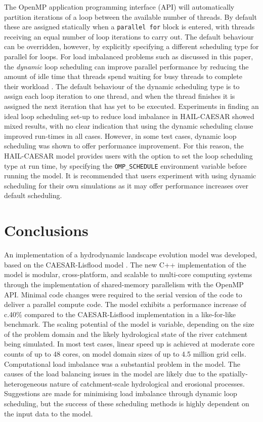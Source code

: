 The OpenMP application programming interface (API) will automatically partition iterations of a loop between the available number of threads. By default these are assigned statically when a \texttt{parallel for} block is entered, with threads receiving an equal number of loop iterations to carry out. The default behaviour can be overridden, however, by explicitly specifying a different scheduling type for parallel for loops. For load imbalanced problems such as discussed in this paper, the \textit{dynamic} loop scheduling can improve parallel performance by reducing the amount of idle time that threads spend waiting for busy threads to complete their workload \citep{willebeek1993strategies,olivier2012openmp}. The default behaviour of the dynamic scheduling type is to assign each loop iteration to one thread, and when the thread finishes it is assigned the next iteration that has yet to be executed. Experiments in finding an ideal loop scheduling set-up to reduce load imbalance in HAIL-CAESAR showed mixed results, with no clear indication that using the dynamic scheduling clause improved run-times in all cases. However, in some test cases, dynamic loop scheduling was shown to offer performance improvement. For this reason, the HAIL-CAESAR model provides users with the option to set the loop scheduling type at run time, by specifying the \texttt{OMP\_SCHEDULE} environment variable before running the model. It is recommended that users experiment with using dynamic scheduling for their own simulations as it may offer performance increases over default scheduling.



\section{Conclusions}  %
An implementation of a hydrodynamic landscape evolution model was developed, based on the CAESAR-Lisflood model \citep{Coulthard2013}. The new C++ implementation of the model is modular, cross-platform, and scalable to multi-core computing systems through the implementation of shared-memory parallelism with the OpenMP API. Minimal code changes were required to the serial version of the code to deliver a parallel compute code. The model exhibits a performance increase of c.40\% compared to the CAESAR-Lisflood implementation in a like-for-like benchmark. The scaling potential of the model is variable, depending on the size of the problem domain and the likely hydrological state of the river catchment being simulated. In most test cases, linear speed up is achieved at moderate core counts of up to 48 cores, on model domain sizes of up to 4.5 million grid cells. Computational load imbalance was a substantial problem in the model. The causes of the load balancing issues in the model are likely due to the spatially-heterogeneous nature of catchment-scale hydrological and erosional processes. Suggestions are made for minimising load imbalance through dynamic loop scheduling, but the success of these scheduling methods is highly dependent on the input data to the model.
